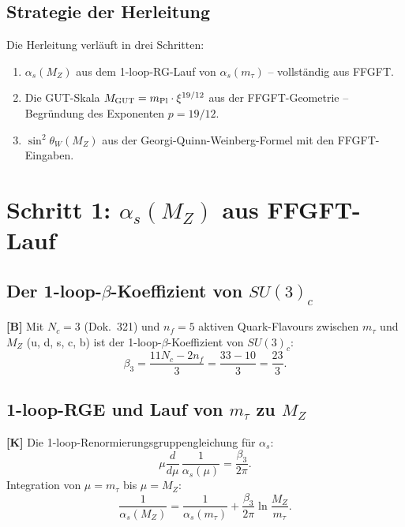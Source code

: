 \subsection{Strategie der Herleitung}

Die Herleitung verläuft in drei Schritten:
\begin{enumerate}
  \item $\alpha_s(M_Z)$ aus dem 1-loop-RG-Lauf von $\alpha_s(m_\tau)$
    -- vollständig aus FFGFT.
  \item Die GUT-Skala $M_{\rm GUT} = m_{\rm Pl}\cdot\xi^{19/12}$
    aus der FFGFT-Geometrie -- Begründung des Exponenten $p = 19/12$.
  \item $\sin^2\theta_W(M_Z)$ aus der
    Georgi-Quinn-Weinberg-Formel mit den FFGFT-Eingaben.
\end{enumerate}

\section{Schritt 1: $\alpha_s(M_Z)$ aus FFGFT-Lauf}

\subsection{Der 1-loop-$\beta$-Koeffizient von $SU(3)_c$}

\textbf{[B]} Mit $N_c = 3$ (Dok.~321) und $n_f = 5$ aktiven
Quark-Flavours zwischen $m_\tau$ und $M_Z$ (u, d, s, c, b) ist der
1-loop-$\beta$-Koeffizient von $SU(3)_c$:
\begin{equation}
  \beta_3 = \frac{11N_c - 2n_f}{3} = \frac{33 - 10}{3} = \frac{23}{3}.
  \label{eq:beta3}
\end{equation}

\subsection{1-loop-RGE und Lauf von $m_\tau$ zu $M_Z$}

\textbf{[K]} Die 1-loop-Renormierungsgruppengleichung für $\alpha_s$:
\begin{equation}
  \mu\frac{d}{d\mu}\,\frac{1}{\alpha_s(\mu)}
  = \frac{\beta_3}{2\pi}.
  \label{eq:rge}
\end{equation}
Integration von $\mu = m_\tau$ bis $\mu = M_Z$:
\begin{equation}
  \frac{1}{\alpha_s(M_Z)}
  = \frac{1}{\alpha_s(m_\tau)}
  + \frac{\beta_3}{2\pi}\ln\!\frac{M_Z}{m_\tau}.
  \label{eq:lauf1}
\end{equation}

